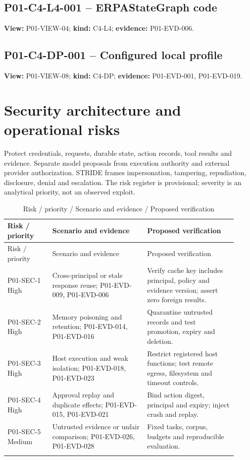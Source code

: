 \documentclass[10pt,letterpaper]{article}
\begin{document}
\subsection{P01-C4-L4-001 -- ERPAStateGraph code}
\textbf{View:} P01-VIEW-04; \textbf{kind:} C4-L4; \textbf{evidence:} P01-EVD-006.\par
{}
\clearpage

\subsection{P01-C4-DP-001 -- Configured local profile}
\textbf{View:} P01-VIEW-08; \textbf{kind:} C4-DP; \textbf{evidence:} P01-EVD-001, P01-EVD-019.\par
{}

\clearpage
\section{Security architecture and operational risks}
Protect credentials, requests, durable state, action records, tool results and evidence. Separate model proposals from execution authority and external provider authorization. STRIDE frames impersonation, tampering, repudiation, disclosure, denial and escalation. The risk register is provisional; severity is an analytical priority, not an observed exploit.
\begin{longtable}{@{}>{\raggedright\arraybackslash}p{0.18\linewidth}>{\raggedright\arraybackslash}p{0.38\linewidth}>{\raggedright\arraybackslash}p{0.36\linewidth}@{}}
\caption{Risk / priority / Scenario and evidence / Proposed verification}\\
\toprule Risk / priority & Scenario and evidence & Proposed verification\\\midrule\endfirsthead
\toprule Risk / priority & Scenario and evidence & Proposed verification\\\midrule\endhead
P01-SEC-1 High & Cross-principal or stale response reuse; P01-EVD-009, P01-EVD-006 & Verify cache key includes principal, policy and evidence version; assert zero foreign results.\\\addlinespace
P01-SEC-2 High & Memory poisoning and retention; P01-EVD-014, P01-EVD-016 & Quarantine untrusted records and test promotion, expiry and deletion.\\\addlinespace
P01-SEC-3 High & Host execution and weak isolation; P01-EVD-018, P01-EVD-023 & Restrict registered host functions; test remote egress, filesystem and timeout controls.\\\addlinespace
P01-SEC-4 High & Approval replay and duplicate effects; P01-EVD-015, P01-EVD-021 & Bind action digest, principal and expiry; inject crash and replay.\\\addlinespace
P01-SEC-5 Medium & Untrusted evidence or unfair comparison; P01-EVD-026, P01-EVD-028 & Fixed tasks, corpus, budgets and reproducible evaluation.\\\addlinespace
\bottomrule\end{longtable}
\end{document}
